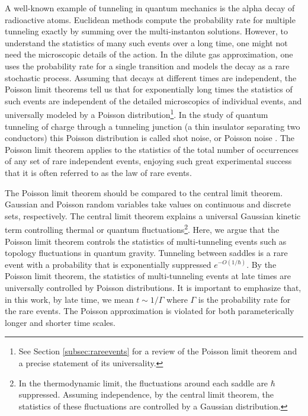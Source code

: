 \documentclass[a4paper,11pt]{article}
\theoremstyle{definition}
\numberwithin{equation}{section}
\newcommand{\NL}[1]{\textcolor{blue}{#1}}
\begin{document}

A well-known example of tunneling in quantum mechanics is the alpha decay of radioactive atoms. Euclidean methods compute the probability rate for multiple tunneling exactly by summing over the multi-instanton solutions. However, to understand the statistics of many such events over a long time, one might not need the microscopic details of the action. In the dilute gas approximation, one uses the probability rate for a single transition and models the decay as a rare stochastic process. Assuming that decays at different times are independent, the Poisson limit theorems tell us that for exponentially long times the statistics of such events are independent of the detailed microscopics of individual events, and universally modeled by a Poisson distribution\footnote{See Section \ref{subsec:rareevents} for a review of the Poisson limit theorem and a precise statement of its universality.}. In the study of quantum tunneling of charge through a tunneling junction (a thin insulator separating two conductors) this Poisson distribution is called shot noise, or Poisson noise \cite{blanter2000shot}. The Poisson limit theorem applies to the statistics of the total number of occurrences of any set of rare independent events, enjoying such great experimental success that it is often referred to as the law of rare events. 


The Poisson limit theorem should be compared to the central limit theorem. Gaussian and Poisson random variables take values on continuous and discrete sets, respectively. The central limit theorem explains a universal Gaussian kinetic term controlling thermal or quantum fluctuations\footnote{In the thermodynamic limit, the fluctuations around each saddle are $\hbar$ suppressed. Assuming independence, by the central limit theorem, the statistics of these fluctuations are controlled by a Gaussian distribution.}. Here, we argue that the Poisson limit theorem controls the statistics of multi-tunneling events such as topology fluctuations in quantum gravity. 
Tunneling between saddles is a rare event with a probability that is exponentially suppressed $e^{-O(1/\hbar)}$. By the Poisson limit theorem, the statistics of multi-tunneling events at late times are universally controlled by Poisson distributions. It is important to emphasize that, in this work, by late time, we mean $t\sim 1/\Gamma$ where $\Gamma$ is the probability rate for the rare events. The Poisson approximation is violated for both parameterically longer and shorter time scales.
\end{document}
